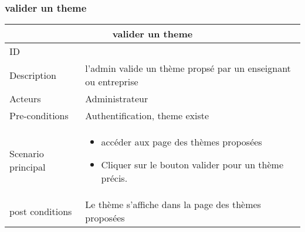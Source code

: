 \documentclass[11pt,fleqn]{book} %
\begin{document}
\subsubsection{valider un theme}
\begin{center}
\begin{tabularx}{1\textwidth} { | p{4cm} | >{\raggedright\arraybackslash}X |  }
  \hline
  \multicolumn{2}{|c|}{valider un theme} \\
 \hline
 ID & 2  \\
 \hline
 Description  &   l'admin valide un thème propsé par un enseignant ou entreprise \\
  \hline
 Acteurs  & Administrateur   \\
  \hline
 Pre-conditions  & Authentification, theme existe\\
 \hline
 Scenario principal  &  
 \begin{itemize}
     \item accéder aux page des thèmes proposées
     \item Cliquer sur le bouton valider pour un thème précis.
 \end{itemize}\\
  \hline
 post conditions  &   Le thème s'affiche dans la page des thèmes proposées  \\
  \hline
\end{tabularx}
\label{tbl:nicetablelesstable}
\end{center}
\end{document}

